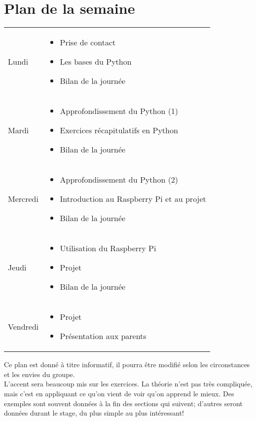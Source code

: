 \section{Plan de la semaine}
\begin{tabular}{p{2cm}p{12cm}}
    Lundi &
    \begin{itemize}
        \item Prise de contact
        \item Les bases du Python
        \item Bilan de la journée
    \end{itemize} \\
    Mardi &
    \begin{itemize}
        \item Approfondissement du Python (1)
        \item Exercices récapitulatifs en Python
        \item Bilan de la journée
    \end{itemize} \\
    Mercredi &
    \begin{itemize}
        \item Approfondissement du Python (2)
        \item Introduction au Raspberry Pi et au projet
        \item Bilan de la journée
    \end{itemize} \\
    Jeudi &
    \begin{itemize}
        \item Utilisation du Raspberry Pi
        \item Projet
        \item Bilan de la journée
    \end{itemize} \\
    Vendredi &
    \begin{itemize} 
        \item Projet
        \item Présentation aux parents 
    \end{itemize} \\
\end{tabular}

Ce plan est donné à titre informatif, il pourra être modifié selon les circonstances et les envies du groupe.\\

L'accent sera beaucoup mis sur les exercices. La théorie n'est pas très compliquée, mais c'est en appliquant ce qu'on vient de voir qu'on apprend le mieux. Des exemples sont souvent données à la fin des sections qui suivent; d'autres seront données durant le stage, du plus simple au plus intéressant!